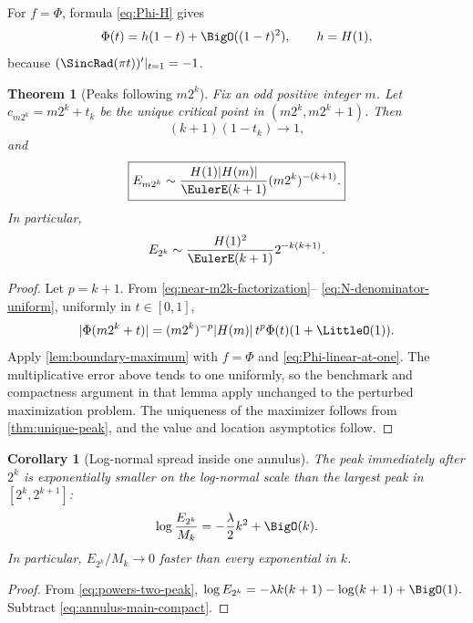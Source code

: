 \documentclass[11pt,oneside]{article}
\newtheorem{theorem}{Theorem}[section]
\newtheorem{corollary}[corollary]{Corollary}
\theoremstyle{definition}
\theoremstyle{remark}
\newcommand{\PhiF}{\Phi}
\begin{document}
For \(f=\PhiF\), formula \eqref{eq:Phi-H} gives
\begin{equation}
 \PhiF(t)=h(1-t)+\BigO((1-t)^2),
 \qquad h=H(1),
 \label{eq:Phi-linear-at-one}
\end{equation}
because \((\SincRad(\pi t))'|_{t=1}=-1\).

\begin{theorem}[Peaks following \(m2^k\)]
\label{thm:two-adic-peaks}
Fix an odd positive integer \(m\).  Let \(c_{m2^k}=m2^k+t_k\) be the unique
critical point in \((m2^k,m2^k+1)\).  Then
\begin{equation}
 (k+1)(1-t_k)\longrightarrow1,
 \label{eq:two-adic-peak-location}
\end{equation}
and
\begin{equation}
\boxed{
 E_{m2^k}\sim
 \frac{H(1)|H(m)|}{\EulerE(k+1)}
 (m2^k)^{-(k+1)}.}
 \label{eq:two-adic-peak-main}
\end{equation}
In particular,
\begin{equation}
 E_{2^k}\sim
 \frac{H(1)^2}{\EulerE(k+1)}2^{-k(k+1)}.
 \label{eq:powers-two-peak}
\end{equation}
\end{theorem}

\begin{proof}
Let \(p=k+1\).  From \eqref{eq:near-m2k-factorization}--
\eqref{eq:N-denominator-uniform}, uniformly in \(t\in[0,1]\),
\[
 |\PhiF(m2^k+t)|
 =(m2^k)^{-p}|H(m)|\,t^p\PhiF(t)(1+\LittleO(1)).
\]
Apply \cref{lem:boundary-maximum} with \(f=\PhiF\) and
\eqref{eq:Phi-linear-at-one}.  The multiplicative error above tends to one
uniformly, so the benchmark and compactness argument in that lemma apply
unchanged to the perturbed maximization problem.  The uniqueness of the
maximizer follows from \cref{thm:unique-peak}, and the value and location
asymptotics follow.
\end{proof}

\begin{corollary}[Log-normal spread inside one annulus]
\label{cor:spread-annulus}
The peak immediately after \(2^k\) is exponentially smaller on the
log-normal scale than the largest peak in \([2^k,2^{k+1}]\):
\begin{equation}
 \log\frac{E_{2^k}}{M_k}
 =-\frac\lambda2k^2+\BigO(k).
 \label{eq:peak-spread}
\end{equation}
In particular, \(E_{2^k}/M_k\to0\) faster than every exponential in \(k\).
\end{corollary}

\begin{proof}
From \eqref{eq:powers-two-peak},
\(
 \log E_{2^k}=-\lambda k(k+1)-\log(k+1)+\BigO(1).
\)
Subtract \eqref{eq:annulus-main-compact}.
\end{proof}
\end{document}
